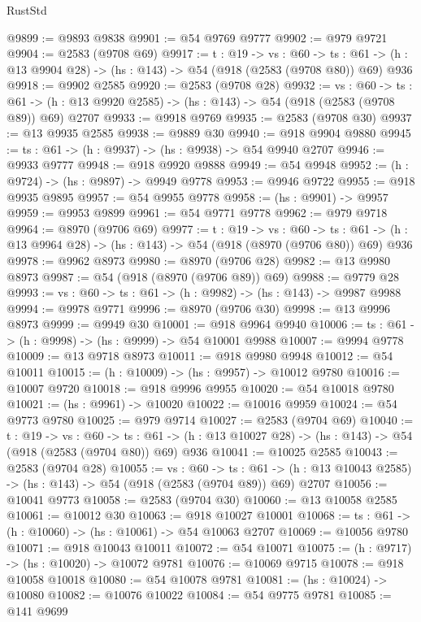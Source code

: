 \begin{lexlean}{RustStd}
\begin{coremodule}
@9899 := @9893 @9838
@9901 := @54 @9769 @9777
@9902 := @979 @9721
@9904 := @2583 (@9708 @69)
@9917 := {t : @19} ->
  {vs : @60} ->
  {ts : @61} -> (h : @13 @9904 @28) -> (hs : @143) -> @54 (@918 (@2583 (@9708 @80)) @69) @936
@9918 := @9902 @2585
@9920 := @2583 (@9708 @28)
@9932 := {vs : @60} ->
  {ts : @61} -> (h : @13 @9920 @2585) -> (hs : @143) -> @54 (@918 (@2583 (@9708 @89)) @69) @2707
@9933 := @9918 @9769
@9935 := @2583 (@9708 @30)
@9937 := @13 @9935 @2585
@9938 := @9889 @30
@9940 := @918 @9904 @9880
@9945 := {ts : @61} -> (h : @9937) -> (hs : @9938) -> @54 @9940 @2707
@9946 := @9933 @9777
@9948 := @918 @9920 @9888
@9949 := @54 @9948
@9952 := (h : @9724) -> (hs : @9897) -> @9949 @9778
@9953 := @9946 @9722
@9955 := @918 @9935 @9895
@9957 := @54 @9955 @9778
@9958 := (hs : @9901) -> @9957
@9959 := @9953 @9899
@9961 := @54 @9771 @9778
@9962 := @979 @9718
@9964 := @8970 (@9706 @69)
@9977 := {t : @19} ->
  {vs : @60} ->
  {ts : @61} -> (h : @13 @9964 @28) -> (hs : @143) -> @54 (@918 (@8970 (@9706 @80)) @69) @936
@9978 := @9962 @8973
@9980 := @8970 (@9706 @28)
@9982 := @13 @9980 @8973
@9987 := @54 (@918 (@8970 (@9706 @89)) @69)
@9988 := @9779 @28
@9993 := {vs : @60} -> {ts : @61} -> (h : @9982) -> (hs : @143) -> @9987 @9988
@9994 := @9978 @9771
@9996 := @8970 (@9706 @30)
@9998 := @13 @9996 @8973
@9999 := @9949 @30
@10001 := @918 @9964 @9940
@10006 := {ts : @61} -> (h : @9998) -> (hs : @9999) -> @54 @10001 @9988
@10007 := @9994 @9778
@10009 := @13 @9718 @8973
@10011 := @918 @9980 @9948
@10012 := @54 @10011
@10015 := (h : @10009) -> (hs : @9957) -> @10012 @9780
@10016 := @10007 @9720
@10018 := @918 @9996 @9955
@10020 := @54 @10018 @9780
@10021 := (hs : @9961) -> @10020
@10022 := @10016 @9959
@10024 := @54 @9773 @9780
@10025 := @979 @9714
@10027 := @2583 (@9704 @69)
@10040 := {t : @19} ->
  {vs : @60} ->
  {ts : @61} -> (h : @13 @10027 @28) -> (hs : @143) -> @54 (@918 (@2583 (@9704 @80)) @69) @936
@10041 := @10025 @2585
@10043 := @2583 (@9704 @28)
@10055 := {vs : @60} ->
  {ts : @61} -> (h : @13 @10043 @2585) -> (hs : @143) -> @54 (@918 (@2583 (@9704 @89)) @69) @2707
@10056 := @10041 @9773
@10058 := @2583 (@9704 @30)
@10060 := @13 @10058 @2585
@10061 := @10012 @30
@10063 := @918 @10027 @10001
@10068 := {ts : @61} -> (h : @10060) -> (hs : @10061) -> @54 @10063 @2707
@10069 := @10056 @9780
@10071 := @918 @10043 @10011
@10072 := @54 @10071
@10075 := (h : @9717) -> (hs : @10020) -> @10072 @9781
@10076 := @10069 @9715
@10078 := @918 @10058 @10018
@10080 := @54 @10078 @9781
@10081 := (hs : @10024) -> @10080
@10082 := @10076 @10022
@10084 := @54 @9775 @9781
@10085 := @141 @9699

\end{coremodule}
\end{lexlean}

